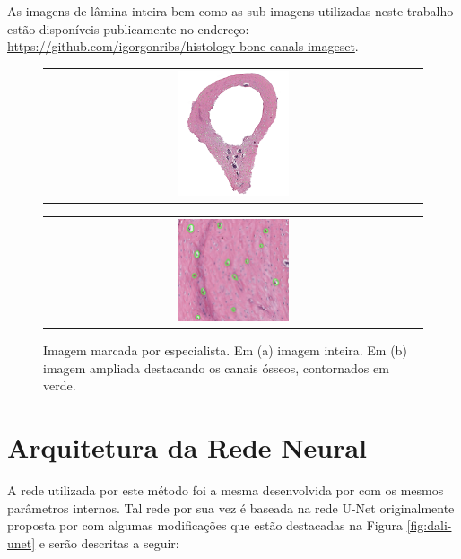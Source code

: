 As imagens de lâmina inteira bem como as sub-imagens utilizadas neste trabalho estão disponíveis publicamente no endereço: \href{https://github.com/igorgonribs/histology-bone-canals-imageset}{https://github.com/igorgonribs/histology-bone-canals-imageset}.

\begin{figure}[h]
    \center
    \begin{tabular}{@{}c@{}}
        \includegraphics[width=0.3\textwidth]{figures/3_methods/imagem_marcada_inteira.png}
    \end{tabular}
    \begin{tabular}{@{}c@{}}
        \includegraphics[width=0.3\textwidth]{figures/3_methods/imagem_marcada_ampliada.jpg}
    \end{tabular}
  
    \caption[Marcação do especialista para o método proposto.]{Imagem marcada por especialista. Em (a) imagem inteira. Em (b) imagem ampliada destacando os canais ósseos, contornados em verde.}
    \label{fig:labelled-images}
\end{figure}

\section{Arquitetura da Rede Neural}
A rede utilizada por este método foi a mesma desenvolvida por \cite{santos2022automated} com os mesmos parâmetros internos. Tal rede por sua vez é baseada na rede U-Net originalmente proposta por \cite{ronneberger2015u} com algumas modificações que estão destacadas na Figura \ref{fig:dali-unet} e serão descritas a seguir:

